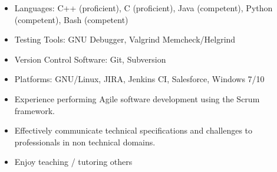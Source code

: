 \documentclass[10pt,letterpaper]{article}
\begin{document}
\begin{minipage}[t]{0.53\textwidth}
	\begin{flushleft}
		\begin{itemize}
			\setlength\itemsep{-0.10em}
			\item Languages: C++ (proficient), C (proficient), Java (competent), Python (competent), Bash (competent)
			\item Testing Tools: GNU Debugger, Valgrind Memcheck/Helgrind
			\item Version Control Software: Git, Subversion
			\item Platforms: GNU/Linux, JIRA, Jenkins CI, Salesforce, Windows 7/10
		\end{itemize}
	\end{flushleft}
\end{minipage}
\begin{minipage}[t]{0.44\textwidth}
	\begin{flushright}
		\begin{flushleft}
			\begin{itemize}
				\setlength\itemsep{-0.10em}
				\item Experience performing Agile software development using the Scrum framework.
				\item Effectively communicate technical specifications
				      and challenges to professionals in non technical domains.
				\item Enjoy teaching / tutoring others
			\end{itemize}
		\end{flushleft}
	\end{flushright}
\end{minipage}
\end{document}
